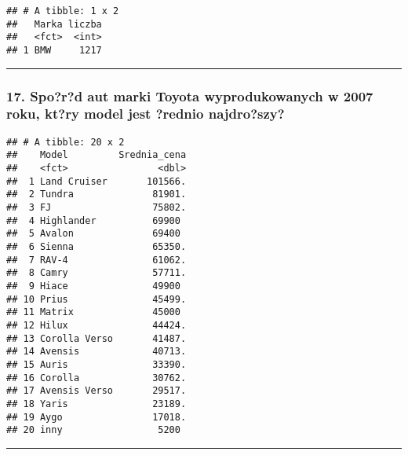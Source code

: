 \documentclass[]{article}
\newenvironment{Shaded}{\begin{snugshade}}{\end{snugshade}}
\newcommand{\KeywordTok}[1]{\textcolor[rgb]{0.13,0.29,0.53}{\textbf{#1}}}
\newcommand{\DataTypeTok}[1]{\textcolor[rgb]{0.13,0.29,0.53}{#1}}
\newcommand{\DecValTok}[1]{\textcolor[rgb]{0.00,0.00,0.81}{#1}}
\newcommand{\StringTok}[1]{\textcolor[rgb]{0.31,0.60,0.02}{#1}}
\newcommand{\OtherTok}[1]{\textcolor[rgb]{0.56,0.35,0.01}{#1}}
\newcommand{\OperatorTok}[1]{\textcolor[rgb]{0.81,0.36,0.00}{\textbf{#1}}}
\newcommand{\NormalTok}[1]{#1}
\begin{document}
\begin{verbatim}
## # A tibble: 1 x 2
##   Marka liczba
##   <fct>  <int>
## 1 BMW     1217
\end{verbatim}

\begin{center}\rule{0.5\linewidth}{\linethickness}\end{center}

\subsubsection{17. Spo?r?d aut marki Toyota wyprodukowanych w 2007 roku,
kt?ry model jest ?rednio
najdro?szy?}\label{spord-aut-marki-toyota-wyprodukowanych-w-2007-roku-ktry-model-jest-rednio-najdroszy}

\begin{Shaded}
\end{Shaded}

\begin{verbatim}
## # A tibble: 20 x 2
##    Model         Srednia_cena
##    <fct>                <dbl>
##  1 Land Cruiser       101566.
##  2 Tundra              81901.
##  3 FJ                  75802.
##  4 Highlander          69900 
##  5 Avalon              69400 
##  6 Sienna              65350.
##  7 RAV-4               61062.
##  8 Camry               57711.
##  9 Hiace               49900 
## 10 Prius               45499.
## 11 Matrix              45000 
## 12 Hilux               44424.
## 13 Corolla Verso       41487.
## 14 Avensis             40713.
## 15 Auris               33390.
## 16 Corolla             30762.
## 17 Avensis Verso       29517.
## 18 Yaris               23189.
## 19 Aygo                17018.
## 20 inny                 5200
\end{verbatim}

\begin{center}\rule{0.5\linewidth}{\linethickness}\end{center}
\end{document}
